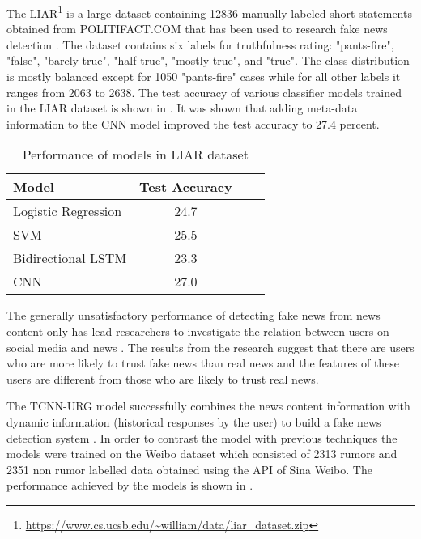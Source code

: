 The LIAR\footnote{\url{https://www.cs.ucsb.edu/~william/data/liar_dataset.zip}} is a large dataset containing 12836 manually labeled short statements obtained from POLITIFACT.COM that has been used to research fake news detection \cite{wang2017liar}. The dataset contains six labels for truthfulness rating: "pants-fire", "false", "barely-true", "half-true", "mostly-true", and "true". The class distribution is mostly balanced except for 1050 "pants-fire" cases while for all other labels it ranges from 2063 to 2638. The test accuracy of various classifier models trained in the LIAR dataset is shown in  \cite{wang2017liar}. It was shown that adding meta-data information to the CNN model improved the test accuracy to 27.4 percent.

\begin{table}[h]
\begin{center}
\caption{Performance of models in LIAR dataset}
\label{tbl:liar_performance}
\begin{tabular}{@{}lccc@{}}
\toprule 
\rule[-1pt]{0pt}{14pt}Model&Test Accuracy\\
\midrule 
\rule[-1pt]{0pt}{14pt}Logistic Regression&24.7\\
\rule[-1pt]{0pt}{14pt}SVM&25.5\\
\rule[-1pt]{0pt}{14pt}Bidirectional LSTM&23.3\\
\rule[-1pt]{0pt}{14pt}CNN&27.0\\
\bottomrule
\end{tabular}
\end{center}
\end{table}


The generally unsatisfactory performance of detecting fake news from news content only has lead researchers to investigate the relation between users on social media and news \cite{shu2018understanding}. The results from the research suggest that there are users who are more likely to trust fake news than real news and the features of these users are different from those who are likely to trust real news.

The TCNN-URG model successfully combines the news content information with dynamic information (historical responses by the user) to build a fake news detection system \cite{qian2018neural}. In order to contrast the model with previous techniques the models were trained on the Weibo dataset\cite{ma2016detecting} which consisted of 2313 rumors and 2351 non rumor labelled data obtained using the API of Sina Weibo. The performance achieved by the models is shown in  \cite{qian2018neural}.

